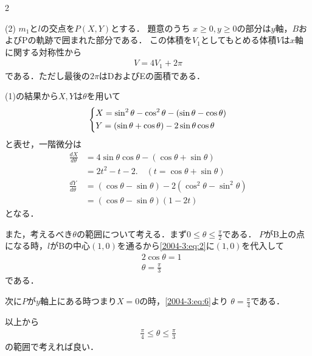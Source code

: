 \documentclass[../../../../main.tex]{subfiles}
\begin{document}
\begin{multicols}{2}
  \vspace{10pt}


  (2)
  $m_1$と$l$の交点を$P(X,Y)$とする．
  題意のうち $x \ge 0,  y \ge 0$の部分は$y$軸，$B$およびPの軌跡で囲まれた部分である．
  この体積を$V_1$としてもとめる体積$V$は$x$軸に関する対称性から
  \begin{align}
    V = 4V_1 + 2\pi\label{2004-3:eq:5}
  \end{align}
  である．ただし最後の$2\pi$はDおよびEの面積である．

  (1)の結果から$X,Y$は$\theta$を用いて
  \begin{align}
    \begin{dcases}
      X = \sin^2\theta - \cos^2\theta - (\sin\theta-\cos\theta) \\
      Y = (\sin\theta+\cos\theta) - 2\sin\theta\cos\theta
    \end{dcases} \label{2004-3:eq:6}
  \end{align}
  と表せ，一階微分は
  \begin{align}
    \frac{dX}{d\theta}
     & = 4\sin\theta\cos\theta - (\cos\theta+\sin\theta)                     \\
     & = 2t^2 - t - 2. \quad (t=\cos\theta+\sin\theta)   \label{2004-3:eq:7} \\
    \frac{dY}{d\theta}
     & = (\cos\theta-\sin\theta) - 2(\cos^2\theta-\sin^2\theta)              \\
     & = (\cos\theta-\sin\theta)(1-2t) \label{2004-3:eq:8}
  \end{align}
  となる．

  また，考えるべき$\theta$の範囲について考える．まず$0 \le \theta \le \frac{\pi}{2}$である．
  $P$がB上の点になる時，$l$がBの中心$(1,0)$を通るから\cref{2004-3:eq:2}に$(1,0)$を代入して
  \begin{align*}
     & 2 \cos\theta = 1       \\
     & \theta = \frac{\pi}{3}
  \end{align*}
  である．

  次に$P$が$y$軸上にある時つまり$X=0$の時，\cref{2004-3:eq:6}より
  $\theta=\frac{\pi}{4}$である．

  以上から
  \begin{align*}
    \frac{\pi}{4} \le \theta \le \frac{\pi}{3}
  \end{align*}
  の範囲で考えれば良い．


  \begin{figure}[H]
    \centering
\end{figure}
\end{multicols}
\end{document}
